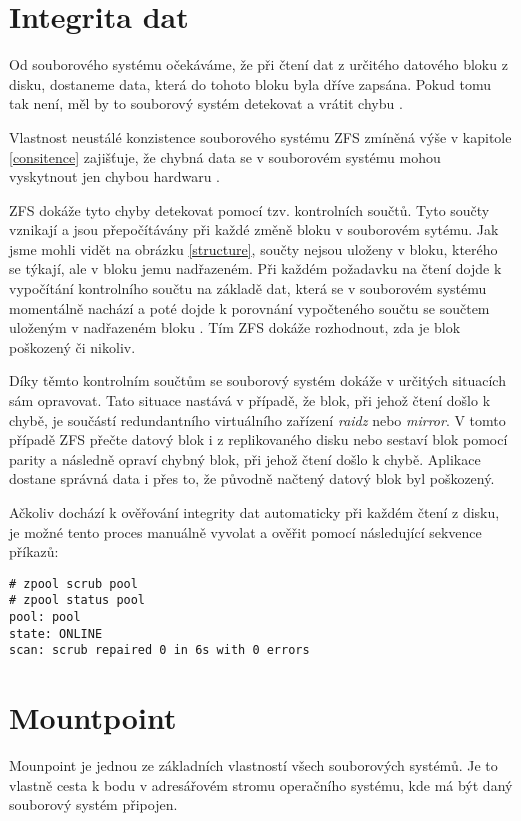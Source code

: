 \section{Integrita dat}
\label{checksum}
Od souborového systému očekáváme, že při čtení dat z určitého datového bloku z disku, dostaneme data, která do tohoto bloku byla dříve zapsána. Pokud tomu tak není, měl by to souborový systém detekovat a vrátit chybu \cite{integrity1}.

Vlastnost neustálé konzistence souborového systému ZFS zmíněná výše v kapitole \ref{consitence} zajišťuje, že chybná data se v souborovém systému mohou vyskytnout jen chybou hardwaru \cite{integrity2}.

ZFS dokáže tyto chyby detekovat pomocí tzv. kontrolních součtů. Tyto součty vznikají a jsou přepočítávány při každé změně bloku v souborovém sytému. Jak jsme mohli vidět na obrázku \ref{structure}, součty nejsou uloženy v bloku, kterého se týkají, ale v bloku jemu nadřazeném. Při každém požadavku na čtení dojde k vypočítání kontrolního součtu na základě dat, která se v souborovém systému momentálně nachází a poté dojde k porovnání vypočteného součtu se součtem uloženým v nadřazeném bloku \cite{integrity1}. Tím ZFS dokáže rozhodnout, zda je blok poškozený či nikoliv.

Díky těmto kontrolním součtům se souborový systém dokáže v určitých situacích sám opravovat. Tato situace nastává v případě, že blok, při jehož čtení došlo k chybě, je součástí redundantního virtuálního zařízení \emph{raidz} nebo \emph{mirror}. V tomto případě ZFS přečte datový blok i z replikovaného disku nebo sestaví blok pomocí parity a následně opraví chybný blok, při jehož čtení došlo k chybě. Aplikace dostane správná data i přes to, že původně načtený datový blok byl poškozený.

Ačkoliv dochází k ověřování integrity dat automaticky při každém čtení z disku, je možné tento proces manuálně vyvolat a ověřit pomocí následující sekvence příkazů:
\begin{verbatim}
# zpool scrub pool
# zpool status pool
pool: pool
state: ONLINE
scan: scrub repaired 0 in 6s with 0 errors
\end{verbatim}

\section{Mountpoint}
\label{mountpoint}
Mounpoint je jednou ze základních vlastností všech souborových systémů. Je to vlastně cesta k bodu v adresářovém stromu operačního systému, kde má být daný souborový systém připojen.

